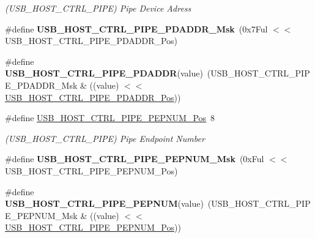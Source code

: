 \begin{DoxyCompactItemize}
\begin{DoxyCompactList}\small\item\em (U\+S\+B\+\_\+\+H\+O\+S\+T\+\_\+\+C\+T\+R\+L\+\_\+\+P\+I\+P\+E) Pipe Device Adress \end{DoxyCompactList}\item 
\hypertarget{group___s_a_m_l21___u_s_b_ga1c29496dd25bb03181fdb8f4a5915baa}{}\#define {\bfseries U\+S\+B\+\_\+\+H\+O\+S\+T\+\_\+\+C\+T\+R\+L\+\_\+\+P\+I\+P\+E\+\_\+\+P\+D\+A\+D\+D\+R\+\_\+\+Msk}~(0x7\+Ful $<$$<$ U\+S\+B\+\_\+\+H\+O\+S\+T\+\_\+\+C\+T\+R\+L\+\_\+\+P\+I\+P\+E\+\_\+\+P\+D\+A\+D\+D\+R\+\_\+\+Pos)\label{group___s_a_m_l21___u_s_b_ga1c29496dd25bb03181fdb8f4a5915baa}

\item 
\hypertarget{group___s_a_m_l21___u_s_b_ga15bad546d52a34b5cfe0cbca95ded474}{}\#define {\bfseries U\+S\+B\+\_\+\+H\+O\+S\+T\+\_\+\+C\+T\+R\+L\+\_\+\+P\+I\+P\+E\+\_\+\+P\+D\+A\+D\+D\+R}(value)~(U\+S\+B\+\_\+\+H\+O\+S\+T\+\_\+\+C\+T\+R\+L\+\_\+\+P\+I\+P\+E\+\_\+\+P\+D\+A\+D\+D\+R\+\_\+\+Msk \& ((value) $<$$<$ \hyperlink{group___s_a_m_l21___u_s_b_ga9cd5539debbbaaab60a622e533592b44}{U\+S\+B\+\_\+\+H\+O\+S\+T\+\_\+\+C\+T\+R\+L\+\_\+\+P\+I\+P\+E\+\_\+\+P\+D\+A\+D\+D\+R\+\_\+\+Pos}))\label{group___s_a_m_l21___u_s_b_ga15bad546d52a34b5cfe0cbca95ded474}

\item 
\hypertarget{group___s_a_m_l21___u_s_b_gaa3bfb733faf29dee4ab9782319c7ae22}{}\#define \hyperlink{group___s_a_m_l21___u_s_b_gaa3bfb733faf29dee4ab9782319c7ae22}{U\+S\+B\+\_\+\+H\+O\+S\+T\+\_\+\+C\+T\+R\+L\+\_\+\+P\+I\+P\+E\+\_\+\+P\+E\+P\+N\+U\+M\+\_\+\+Pos}~8\label{group___s_a_m_l21___u_s_b_gaa3bfb733faf29dee4ab9782319c7ae22}

\begin{DoxyCompactList}\small\item\em (U\+S\+B\+\_\+\+H\+O\+S\+T\+\_\+\+C\+T\+R\+L\+\_\+\+P\+I\+P\+E) Pipe Endpoint Number \end{DoxyCompactList}\item 
\hypertarget{group___s_a_m_l21___u_s_b_ga9a451c832de1b4b7e33559df4478c676}{}\#define {\bfseries U\+S\+B\+\_\+\+H\+O\+S\+T\+\_\+\+C\+T\+R\+L\+\_\+\+P\+I\+P\+E\+\_\+\+P\+E\+P\+N\+U\+M\+\_\+\+Msk}~(0x\+Ful $<$$<$ U\+S\+B\+\_\+\+H\+O\+S\+T\+\_\+\+C\+T\+R\+L\+\_\+\+P\+I\+P\+E\+\_\+\+P\+E\+P\+N\+U\+M\+\_\+\+Pos)\label{group___s_a_m_l21___u_s_b_ga9a451c832de1b4b7e33559df4478c676}

\item 
\hypertarget{group___s_a_m_l21___u_s_b_ga67ec699f6e5602fa894d731af00c928c}{}\#define {\bfseries U\+S\+B\+\_\+\+H\+O\+S\+T\+\_\+\+C\+T\+R\+L\+\_\+\+P\+I\+P\+E\+\_\+\+P\+E\+P\+N\+U\+M}(value)~(U\+S\+B\+\_\+\+H\+O\+S\+T\+\_\+\+C\+T\+R\+L\+\_\+\+P\+I\+P\+E\+\_\+\+P\+E\+P\+N\+U\+M\+\_\+\+Msk \& ((value) $<$$<$ \hyperlink{group___s_a_m_l21___u_s_b_gaa3bfb733faf29dee4ab9782319c7ae22}{U\+S\+B\+\_\+\+H\+O\+S\+T\+\_\+\+C\+T\+R\+L\+\_\+\+P\+I\+P\+E\+\_\+\+P\+E\+P\+N\+U\+M\+\_\+\+Pos}))\label{group___s_a_m_l21___u_s_b_ga67ec699f6e5602fa894d731af00c928c}


\end{DoxyCompactItemize}
